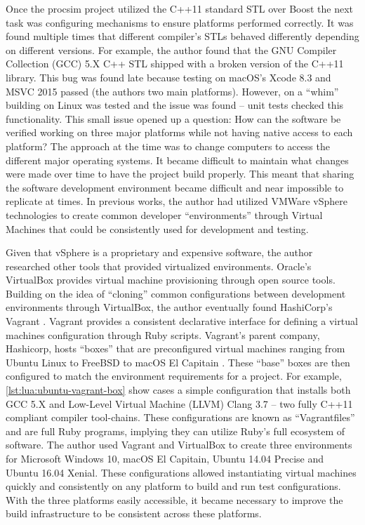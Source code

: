 Once the procsim project utilized the C++11 standard STL over Boost the next task was configuring mechanisms to ensure platforms performed correctly. It was found multiple times that different compiler's STLs behaved differently depending on different versions. For example, the author found that the GNU Compiler Collection (GCC) \cite{GCC} 5.X C++ STL shipped with a broken version of the C++11  library. This bug was found late because testing on macOS's Xcode 8.3 and MSVC 2015 passed (the authors two main platforms). However, on a ``whim'' building on Linux was tested and the issue was found -- unit tests checked this functionality. This small issue opened up a question: How can the software be verified working on three major platforms while not having native access to each platform? The approach at the time was to change computers to access the different major operating systems. It became difficult to maintain what changes were made over time to have the project build properly. This meant that sharing the software development environment became difficult and near impossible to replicate at times. In previous works, the author had utilized VMWare vSphere \cite{VMWare:vSphere} technologies to create common developer ``environments'' through Virtual Machines that could be consistently used for development and testing. 

Given that vSphere is a proprietary and expensive software, the author researched other tools that provided virtualized environments. Oracle's VirtualBox \cite{Oracle:VirtualBox} provides virtual machine provisioning through open source tools. Building on the idea of ``cloning'' common configurations between development environments through VirtualBox, the author eventually found HashiCorp's Vagrant \cite{VagrantUp}. Vagrant provides a consistent declarative interface for defining a virtual machines configuration through Ruby scripts. Vagrant's parent company, Hashicorp, hosts ``boxes'' that are preconfigured virtual machines ranging from Ubuntu Linux to FreeBSD to macOS El Capitain \cite{Vagrant:Boxes}. These ``base'' boxes are then configured to match the environment requirements for a project. For example, \cref{lst:lua:ubuntu-vagrant-box} show cases a simple configuration that installs both GCC 5.X and Low-Level Virtual Machine (LLVM) Clang \cite{LLVM:Clang} 3.7 -- two fully C++11 compliant compiler tool-chains. These configurations are known as ``Vagrantfiles'' and are full Ruby programs, implying they can utilize Ruby's full ecosystem of software. The author used Vagrant and VirtualBox to create three environments for Microsoft Windows 10, macOS El Capitain, Ubuntu 14.04 Precise and Ubuntu 16.04 Xenial. These configurations allowed instantiating virtual machines quickly and consistently on any platform to build and run test configurations. With the three platforms easily accessible, it became necessary to improve the build infrastructure to be consistent across these platforms.

